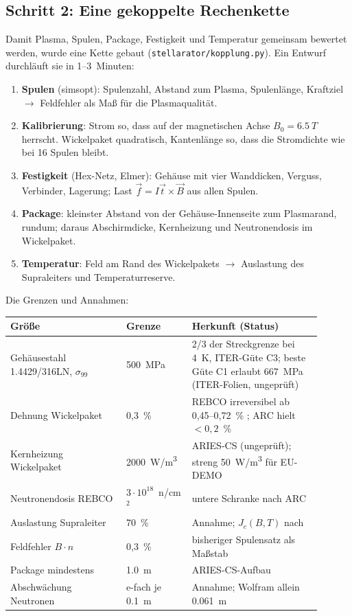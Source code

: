 \subsection*{Schritt 2: Eine gekoppelte Rechenkette}
Damit Plasma, Spulen, Package, Festigkeit und Temperatur gemeinsam bewertet werden, wurde eine Kette gebaut
(\texttt{stellarator/kopplung.py}). Ein Entwurf durchläuft sie in 1--3~Minuten:
\begin{enumerate}\itemsep1pt
\item \textbf{Spulen} (simsopt): Spulenzahl, Abstand zum Plasma, Spulenlänge, Kraftziel $\to$ Feldfehler als Maß
  für die Plasmaqualität.
\item \textbf{Kalibrierung}: Strom so, dass auf der magnetischen Achse $B_0 = \SI{6,5}{T}$ herrscht. Wickelpaket
  quadratisch, Kantenlänge so, dass die Stromdichte wie bei 16 Spulen bleibt.
\item \textbf{Festigkeit} (Hex-Netz, Elmer): Gehäuse mit vier Wanddicken, Verguss, Verbinder, Lagerung; Last
  $\vec f = I\vec t\times\vec B$ aus allen Spulen.
\item \textbf{Package}: kleinster Abstand von der Gehäuse-Innenseite zum Plasmarand, rundum; daraus Abschirmdicke,
  Kernheizung und Neutronendosis im Wickelpaket.
\item \textbf{Temperatur}: Feld am Rand des Wickelpakets $\to$ Auslastung des Supraleiters und Temperaturreserve.
\end{enumerate}
Die Grenzen und Annahmen:
\begin{center}\small
\begin{tabular}{p{0.34\linewidth}p{0.18\linewidth}p{0.38\linewidth}}
\toprule
Größe & Grenze & Herkunft (Status) \\
\midrule
Gehäusestahl 1.4429/316LN, $\sigma_{99}$ & \SI{500}{MPa} & 2/3 der Streckgrenze bei 4~K, ITER-Güte C3; beste Güte C1 erlaubt 667~MPa (ITER-Folien, ungeprüft) \\
Dehnung Wickelpaket & 0,3~\% & REBCO irreversibel ab 0,45--0,72~\% \cite{barth2015}; ARC hielt $<0{,}2$~\% \cite{sorbom2015} \\
Kernheizung Wickelpaket & \SI{2000}{W/m^3} & ARIES-CS (ungeprüft); streng \SI{50}{W/m^3} für EU-DEMO \cite{cufar2019} \\
Neutronendosis REBCO & $3\cdot10^{18}$~n/cm$^2$ & untere Schranke nach ARC \cite{sorbom2015} \\
Auslastung Supraleiter & 70~\% & Annahme; $J_c(B,T)$ nach \cite{senatore2024,pardo2026} \\
Feldfehler $B\cdot n$ & 0,3~\% & bisheriger Spulensatz als Maßstab \\
Package mindestens & \SI{1,0}{m} & ARIES-CS-Aufbau \cite{elguebaly2005} \\
Abschwächung Neutronen & e-fach je \SI{0,1}{m} & Annahme; Wolfram allein \SI{0,061}{m} \cite{windsor2021} \\
\bottomrule
\end{tabular}
\end{center}
